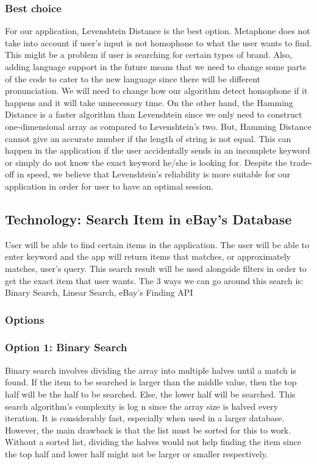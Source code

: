 \documentclass[journal,compsoc, 10pt, draftclsnofoot, onecolumn]{IEEEtran}
\begin{document}
\subsubsection{Best choice}
For our application, Levenshtein Distance is the best option. Metaphone does not take
into account if user's input is not homophone to what the user wants to find. This
might be a problem if user is searching for certain types of brand. Also, adding
language support in the future means that we need to change some parts of the code to
cater to the new language since there will be different pronunciation. We will need
to change how our algorithm detect homophone if it happens and it will take
unnecessary time. On the other hand, the Hamming Distance is a faster algorithm than
Levenshtein since we only need to construct one-dimensional array as compared to
Levenshtein's two. But, Hamming Distance cannot give an accurate number if the length
of string is not equal. This can happen in the application if the user accidentally
sends in an incomplete keyword or simply do not know the exact keyword he/she is
looking for. Despite the trade-off in speed, we believe that Levenshtein's
reliability is more suitable for our application in order for user to have an optimal
session.

\subsection{Technology: Search Item in eBay's Database}
User will be able to find certain items in the application. The user will be able to
enter keyword and the app will return items that matches, or approximately matches,
user's query. This search result will be used alongside filters in order to get the
exact item that user wants.
The 3 ways we can go around this search is: Binary Search, Linear Search, eBay's
Finding API

\subsubsection{Options}
\subsubsection*{Option 1: Binary Search}
Binary search involves dividing the array into multiple halves until a match is
found. If the item to be searched is larger than the middle value, then the top half
will be the half to be searched. Else, the lower half will be searched. This search
algorithm's complexity is log n since the array size is halved every iteration. It is
considerably fast, especially when used in a larger database. However, the main
drawback is that the list must be sorted for this to work. Without a sorted list,
dividing the halves would not help finding the item since the top half and lower half
might not be larger or smaller respectively.
\end{document}
